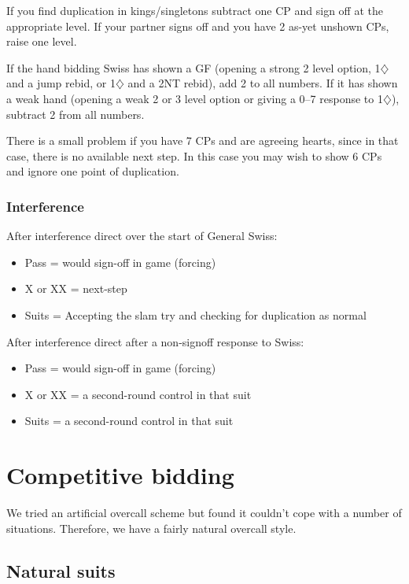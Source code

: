 \documentclass[a4paper,14pt]{extarticle}
\begin{document}
If you find duplication in kings/singletons subtract one CP and sign off at the
appropriate level. If your partner signs off and you have 2 as-yet unshown CPs,
raise one level.

If the hand bidding Swiss has shown a GF (opening a strong 2 level option,
1$\diamondsuit$ and a jump rebid, or 1$\diamondsuit$ and a 2NT rebid), add 2 to
all numbers. If it has shown a weak hand (opening a weak 2 or 3 level option or
giving a 0--7 response to 1$\diamondsuit$), subtract 2 from all numbers.

There is a small problem if you have 7 CPs and are agreeing hearts, since in
that case, there is no available next step. In this case you may wish to show
6 CPs and ignore one point of duplication.

\subsubsection{Interference}

After interference direct over the start of General Swiss:

\begin{itemize}
	\item Pass = would sign-off in game (forcing)
	\item X or XX = next-step
	\item Suits = Accepting the slam try and checking for duplication as normal
\end{itemize}

After interference direct after a non-signoff response to Swiss:

\begin{itemize}
	\item Pass = would sign-off in game (forcing)
	\item X or XX = a second-round control in that suit
	\item Suits = a second-round control in that suit
\end{itemize}

\newpage

\section{Competitive bidding}
\label{sec:competitive}

We tried an artificial overcall scheme but found it couldn't cope with a number of situations.
Therefore, we have a fairly natural overcall style.

\subsection{Natural suits}
\label{sec:def:1x}
\end{document}
